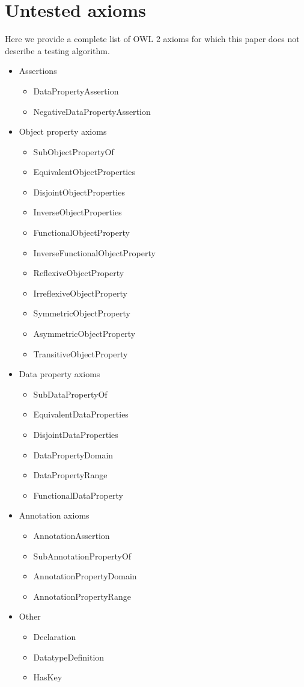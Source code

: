 \documentclass[paper.tex]{subfiles}
\begin{document}
\section{Untested axioms}
\label{app:untested}

Here we provide a complete list of OWL 2 axioms for which this paper does not describe a testing algorithm.

\begin{itemize}
  \item Assertions
  \begin{itemize}[noitemsep]
    \ttfamily
    \item DataPropertyAssertion
    \item NegativeDataPropertyAssertion
  \end{itemize}

  \item Object property axioms
  \begin{itemize}[noitemsep]
    \ttfamily
    \item SubObjectPropertyOf
    \item EquivalentObjectProperties
    \item DisjointObjectProperties
    \item InverseObjectProperties
    \item FunctionalObjectProperty
    \item InverseFunctionalObjectProperty
    \item ReflexiveObjectProperty
    \item IrreflexiveObjectProperty
    \item SymmetricObjectProperty
    \item AsymmetricObjectProperty
    \item TransitiveObjectProperty
  \end{itemize}

  \item Data property axioms
  \begin{itemize}[noitemsep]
    \ttfamily
    \item SubDataPropertyOf
    \item EquivalentDataProperties
    \item DisjointDataProperties
    \item DataPropertyDomain
    \item DataPropertyRange
    \item FunctionalDataProperty
  \end{itemize}

  \item Annotation axioms
  \begin{itemize}[noitemsep]
    \ttfamily
    \item AnnotationAssertion
    \item SubAnnotationPropertyOf
    \item AnnotationPropertyDomain
    \item AnnotationPropertyRange
  \end{itemize}

  \item Other
  \begin{itemize}[noitemsep]
    \ttfamily
    \item Declaration
    \item DatatypeDefinition
    \item HasKey
  \end{itemize}
\end{itemize}
\end{document}
